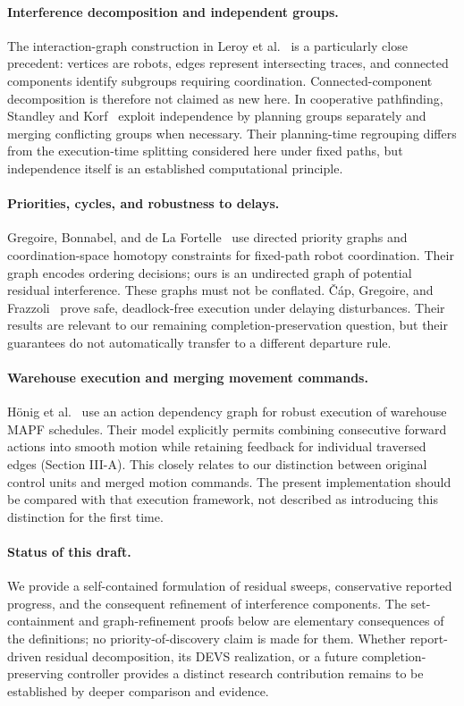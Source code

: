 \documentclass[11pt,a4paper]{article}
\theoremstyle{remark}
\begin{document}
\paragraph{Interference decomposition and independent groups.}
The interaction-graph construction in Leroy et al.~\cite{leroy1999} is a
particularly close precedent: vertices are robots, edges represent
intersecting traces, and connected components identify subgroups requiring
coordination. Connected-component decomposition is therefore not claimed as
new here. In cooperative pathfinding, Standley and Korf~\cite{standley2011}
exploit independence by planning groups separately and merging conflicting
groups when necessary. Their planning-time regrouping differs from the
execution-time splitting considered here under fixed paths, but independence
itself is an established computational principle.

\paragraph{Priorities, cycles, and robustness to delays.}
Gregoire, Bonnabel, and de La Fortelle~\cite{gregoire2015} use directed priority
graphs and coordination-space homotopy constraints for fixed-path robot
coordination. Their graph encodes ordering decisions; ours is an undirected
graph of potential residual interference. These graphs must not be conflated.
\v{C}\'ap, Gregoire, and Frazzoli~\cite{cap2016} prove safe, deadlock-free
execution under delaying disturbances. Their results are relevant to our
remaining completion-preservation question, but their guarantees do not
automatically transfer to a different departure rule.

\paragraph{Warehouse execution and merging movement commands.}
H\"onig et al.~\cite{hoenig2019} use an action dependency graph for robust
execution of warehouse MAPF schedules. Their model explicitly permits
combining consecutive forward actions into smooth motion while retaining
feedback for individual traversed edges (Section III-A). This closely relates
to our distinction between original control units and merged motion
commands. The present implementation should be compared with that execution
framework, not described as introducing this distinction for the first time.

\paragraph{Status of this draft.}
We provide a self-contained formulation of residual sweeps, conservative
reported progress, and the consequent refinement of interference components.
The set-containment and graph-refinement proofs below are elementary
consequences of the definitions; no priority-of-discovery claim is made for
them. Whether report-driven residual decomposition, its DEVS realization, or
a future completion-preserving controller provides a distinct research
contribution remains to be established by deeper comparison and evidence.
\end{document}
